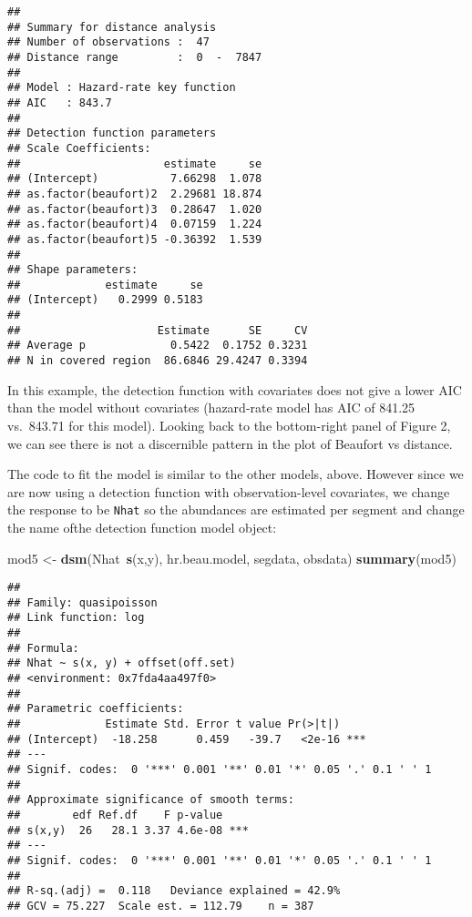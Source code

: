 \documentclass[]{article}
\newenvironment{Shaded}{}{}
\newcommand{\KeywordTok}[1]{\textcolor[rgb]{0.00,0.44,0.13}{\textbf{{#1}}}}
\newcommand{\StringTok}[1]{\textcolor[rgb]{0.25,0.44,0.63}{{#1}}}
\newcommand{\NormalTok}[1]{{#1}}
\begin{document}
\begin{verbatim}
## 
## Summary for distance analysis 
## Number of observations :  47 
## Distance range         :  0  -  7847 
## 
## Model : Hazard-rate key function 
## AIC   : 843.7 
## 
## Detection function parameters
## Scale Coefficients:  
##                      estimate     se
## (Intercept)           7.66298  1.078
## as.factor(beaufort)2  2.29681 18.874
## as.factor(beaufort)3  0.28647  1.020
## as.factor(beaufort)4  0.07159  1.224
## as.factor(beaufort)5 -0.36392  1.539
## 
## Shape parameters:  
##             estimate     se
## (Intercept)   0.2999 0.5183
## 
##                     Estimate      SE     CV
## Average p             0.5422  0.1752 0.3231
## N in covered region  86.6846 29.4247 0.3394
\end{verbatim}

In this example, the detection function with covariates does not give a
lower AIC than the model without covariates (hazard-rate model has AIC
of 841.25 vs.~843.71 for this model). Looking back to the bottom-right
panel of Figure 2, we can see there is not a discernible pattern in the
plot of Beaufort vs distance.

The code to fit the model is similar to the other models, above. However
since we are now using a detection function with observation-level
covariates, we change the response to be \texttt{Nhat} so the abundances
are estimated per segment and change the name ofthe detection function
model object:

\begin{Shaded}
\begin{Highlighting}[]
\NormalTok{mod5 <-}\StringTok{ }\KeywordTok{dsm}\NormalTok{(Nhat~}\KeywordTok{s}\NormalTok{(x,y), hr.beau.model, segdata, obsdata)}
\KeywordTok{summary}\NormalTok{(mod5)}
\end{Highlighting}
\end{Shaded}

\begin{verbatim}
## 
## Family: quasipoisson 
## Link function: log 
## 
## Formula:
## Nhat ~ s(x, y) + offset(off.set)
## <environment: 0x7fda4aa497f0>
## 
## Parametric coefficients:
##             Estimate Std. Error t value Pr(>|t|)    
## (Intercept)  -18.258      0.459   -39.7   <2e-16 ***
## ---
## Signif. codes:  0 '***' 0.001 '**' 0.01 '*' 0.05 '.' 0.1 ' ' 1
## 
## Approximate significance of smooth terms:
##        edf Ref.df    F p-value    
## s(x,y)  26   28.1 3.37 4.6e-08 ***
## ---
## Signif. codes:  0 '***' 0.001 '**' 0.01 '*' 0.05 '.' 0.1 ' ' 1
## 
## R-sq.(adj) =  0.118   Deviance explained = 42.9%
## GCV = 75.227  Scale est. = 112.79    n = 387
\end{verbatim}
\end{document}
